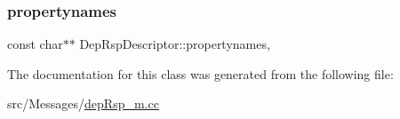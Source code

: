 \subsubsection{\texorpdfstring{propertynames}{propertynames}}
{\footnotesize\ttfamily const char$\ast$$\ast$ Dep\+Rsp\+Descriptor\+::propertynames\hspace{0.3cm}{\ttfamily [mutable]}, {\ttfamily [private]}}



The documentation for this class was generated from the following file\+:\begin{DoxyCompactItemize}
\item 
src/\+Messages/\hyperlink{dep_rsp__m_8cc}{dep\+Rsp\+\_\+m.\+cc}\end{DoxyCompactItemize}
